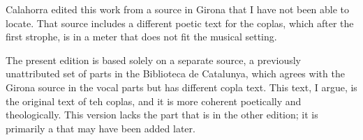\begin{notesources}
    \begin{source}
    \end{source}
    \begin{source}
    \end{source}
\end{notesources}

Calahorra edited this work from a source in Girona that I have not been able
to locate.
That source includes a different poetic text for the coplas, which after the
first strophe, is in a meter that does not fit the musical setting.

The present edition is based solely on a separate source, a previously
unattributed set of parts in the Biblioteca de Catalunya, which agrees with
the Girona source in the vocal parts but has different copla text.
This text, I argue, is the original text of teh coplas, and it is more
coherent poetically and theologically.
This version lacks the  part that is in the other edition;
it is primarily a  that may have been added later.

\endinput
